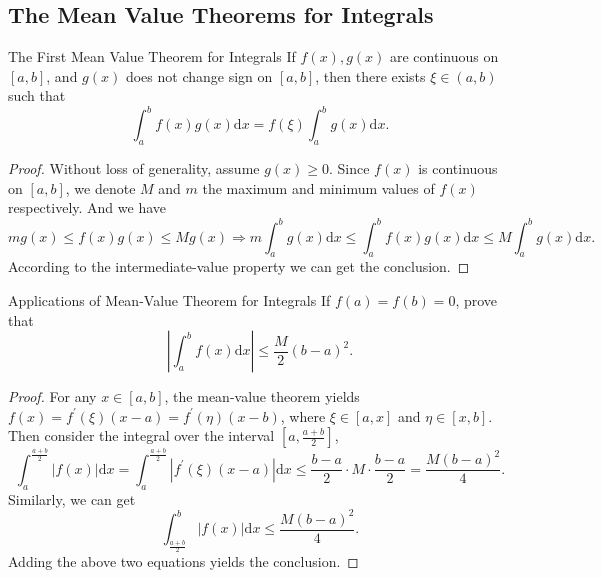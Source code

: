 \subsection{The Mean Value Theorems for Integrals}

\begin{theorem}{The First Mean Value Theorem for Integrals}{}
  If $f(x), g(x)$ are continuous on $[a, b]$,
  and $g(x)$ does not change sign on $[a, b]$,
  then there exists $\xi \in (a, b)$ such that
  \begin{equation}
    \int_a^b f(x) g(x) \mathrm{d} x = f(\xi) \int_a^b g(x) \mathrm{d} x.
  \end{equation}
\end{theorem}

\begin{proof}
  Without loss of generality,
  assume $g(x) \geq 0$. Since $f(x)$ is continuous on $[a, b]$,
  we denote $M$ and $m$ the maximum and minimum values of $f(x)$ respectively.
  And we have
  \begin{equation}
    m g(x) \leq f(x)g(x) \leq Mg(x) \Rightarrow
    m \int_a^b g(x)\mathrm{d} x \leq \int_a^b f(x)g(x)\mathrm{d} x \leq M \int_a^b g(x)\mathrm{d} x.
  \end{equation}
  According to the intermediate-value property we can get the conclusion.
\end{proof}

\begin{example}{Applications of Mean-Value Theorem for Integrals}{}
  If $f(a) = f(b) = 0$, prove that
  \begin{equation}
    \left| \int_a^b f(x)\mathrm{d} x \right| \leq \frac{M}{2} (b - a)^2.
  \end{equation}
\end{example}

\begin{proof}
  For any $x \in [a, b]$, the mean-value theorem yields $f(x) =
  f^{\prime}(\xi)(x - a) = f^{\prime}(\eta)(x - b)$,
  where $\xi \in [a, x]$ and $\eta \in [x, b]$.
  Then consider the integral over the interval $[a, \frac{a+b}{2}]$,
  \begin{equation}
    \int_a^{\frac{a+b}{2}} |f(x)| \mathrm{d} x
    = \int_a^{\frac{a+b}{2}} |f^{\prime}(\xi) (x - a)| \mathrm{d} x
    \leq \frac{b-a}{2} \cdot M \cdot \frac{b-a}{2} = \frac{M(b-a)^2}{4}.
  \end{equation}
  Similarly, we can get
  \begin{equation}
    \int_{\frac{a+b}{2}}^b |f(x)|\mathrm{d} x \leq \frac{M(b-a)^2}{4}.
  \end{equation}
  Adding the above two equations yields the conclusion.
\end{proof}

